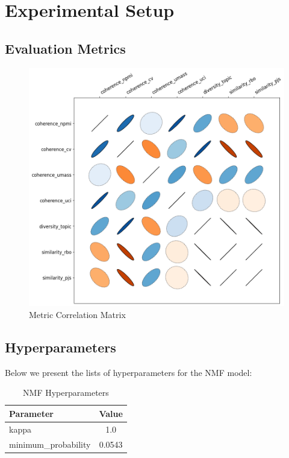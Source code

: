 \section{Experimental Setup}
\label{sec:appB}
\subsection{Evaluation Metrics}
\begin{figure}[H]
\centering
\includegraphics[width=1\columnwidth]{figs/metric_correlations.png}
\caption[Topic Modeling Metric Correlation Matrix]{Metric Correlation Matrix}
\label{appB:metric_correlations}
\end{figure}

\subsection{Hyperparameters}

Below we present the lists of hyperparameters for the NMF model:

\begin{table}[H]
\centering
\begin{tabular}{@{}lc@{}}
\toprule
Parameter           & Value   \\
\midrule
kappa               & 1.0     \\
minimum\_probability& 0.0543  \\
\bottomrule
\end{tabular}
\caption{NMF Hyperparameters}
\end{table}

